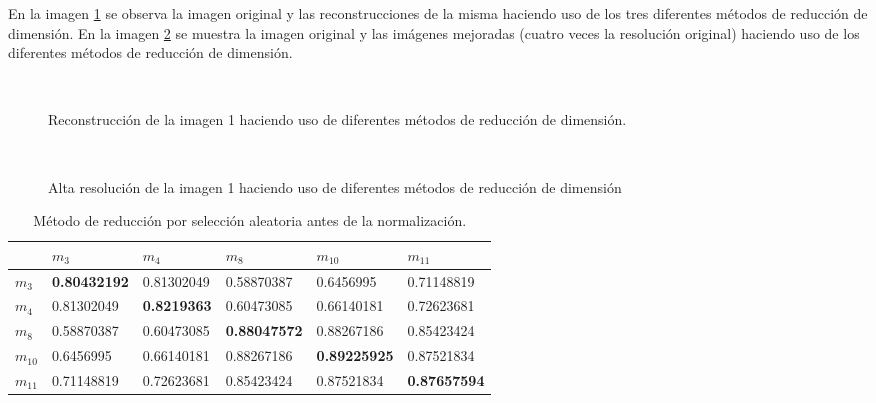 En la imagen \ref{rec1} se observa la imagen original y las reconstrucciones de la misma haciendo uso de los tres diferentes métodos de reducción de dimensión. En la imagen \ref{ar1} se muestra la imagen original y las imágenes mejoradas (cuatro veces la resolución original) haciendo uso de los diferentes métodos de reducción de dimensión. 

\begin{figure}[!htbp]
  \centering
  \qquad
  \qquad
  \\
  \caption{Reconstrucción de la imagen 1 haciendo uso de diferentes métodos de reducción de dimensión.}
  \label{rec1}
\end{figure}


\begin{figure}[!htbp]
  \centering
  \qquad
  \qquad
  \\
  \caption{Alta resolución de la imagen 1 haciendo uso de diferentes métodos de reducción de dimensión}
  \label{ar1}
\end{figure}	


\begin{table}[ht!]
\begin{center}
\begin{tabular}{| p{2cm} | p{2cm} | p{2cm} | p{2cm} | p{2cm} | p{2cm} |}
\hline
 & $m_{3}$ & $m_{4}$ & $m_{8}$ & $m_{10}$ & $m_{11}$ \\
\hline
$m_{3}$ & \bf{0.80432192} & 0.81302049 & 0.58870387 & 0.6456995 & 0.71148819\\
\hline
$m_{4}$ & 0.81302049 & \bf{0.8219363} & 0.60473085 & 0.66140181 & 0.72623681\\
\hline
$m_{8}$ & 0.58870387 & 0.60473085 & \bf{0.88047572} & 0.88267186 & 0.85423424\\
\hline 
$m_{10}$ & 0.6456995 & 0.66140181 & 0.88267186 & \bf{0.89225925} & 0.87521834\\
\hline
$m_{11}$ & 0.71148819 & 0.72623681 & 0.85423424 & 0.87521834 & \bf{0.87657594}\\
\hline
\end{tabular}
\end{center} 	
\caption{Método de reducción por selección aleatoria antes de la normalización.} \label{covran1}
\end{table}

